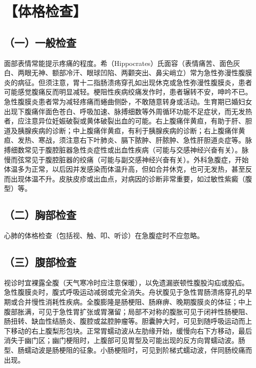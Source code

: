 \section{【体格检查】}

\subsection{（一）一般检查}

面部表情常能提示疼痛的程度。希（Hippocrates）氏面容（表情痛苦、面色灰白、两眼无神、额部冷汗、眼球凹陷、两颧突出、鼻尖峭立）常为急性弥漫性腹膜炎的病征。但须注意，胃十二指肠溃疡穿孔如出现休克或急性弥漫性腹膜炎，患者可能感觉腹痛反而明显减轻。梗阻性疾病绞痛发作时，患者辗转不安，呻吟不已。急性腹膜炎患者常为减轻疼痛而蜷曲侧卧，不敢随意转身或活动。生育期已婚妇女出现下腹痛伴面色苍白、呼吸加速、脉搏细数等外周循环功能不足症状，而无发热者，应注意异位妊娠破裂或黄体破裂出血的可能。右上腹痛伴黄疸，有助于肝、胆道及胰腺疾病的诊断；中上腹痛伴黄疸，有利于胰腺疾病的诊断；右上腹痛伴黄疸、发热、寒战，须注意右下叶肺炎、膈下脓肿、肝脓肿、急性肝胆道炎症等。脉搏细数常见于腹腔脏器急性炎症性或出血性疾病（可能与交感神经兴奋有关）。脉慢而弦常见于腹腔脏器的绞痛（可能与副交感神经兴奋有关）。外科急腹症，开始体温多为正常，以后因并发感染而体温升高，但如合并休克，也可无发热，甚至反而出现体温不升。皮肤皮疹或出血点，对病因的诊断非常重要，如过敏性紫癜（腹型）等。

\subsection{（二）胸部检查}

心肺的体格检查（包括视、触、叩、听诊）在急腹症时不应忽略。

\subsection{（三）腹部检查}

视诊时宜裸露全腹（天气寒冷时应注意保暖），以免遗漏嵌顿性腹股沟疝或股疝。急性腹膜炎时，腹式呼吸运动减弱或完全消失。舟状腹见于急性胃肠溃疡穿孔的早期或合并慢性消耗性疾病。全腹膨隆是肠梗阻、肠麻痹、晚期腹膜炎的体征；中上腹部胀满，可见于急性胃扩张或胃潴留；局部不对称的腹胀可见于闭袢性肠梗阻、肠扭转、缺血性结肠炎、腹腔或盆腔肿瘤等。胆囊肿大时，可见到随呼吸运动而上下移动的右上腹梨形包块。正常胃蠕动波从左肋缘开始，缓慢向右下方移动，最后消失于幽门区；幽门梗阻时，上腹部可见胃型及可能出现的反方向胃蠕动波。肠型、肠蠕动波是肠梗阻的征象。小肠梗阻时，可见到阶梯式蠕动波，伴同肠绞痛而出现。

